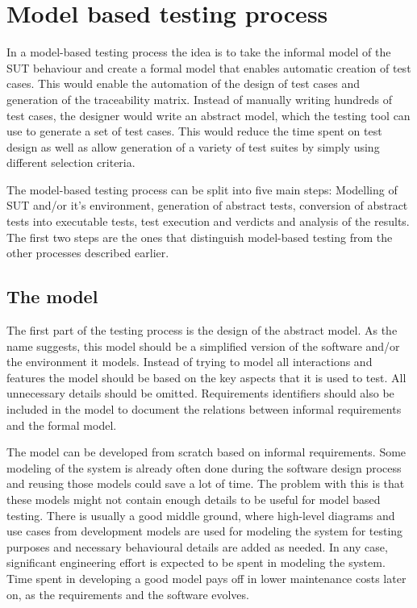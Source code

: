 \section{Model based testing process}
In a model-based testing process the idea is to take the informal model of the SUT behaviour and create a formal model that enables automatic creation of test cases. This would enable the automation of the design of test cases and generation of the traceability matrix. Instead of manually writing hundreds of test cases, the designer would write an abstract model, which the testing tool can use to generate a set of test cases. This would reduce the time spent on test design as well as allow generation of a variety of test suites by simply using different selection criteria.

The model-based testing process can be split into five main steps: Modelling of SUT and/or it's environment, generation of abstract tests, conversion of abstract tests into executable tests, test execution and verdicts and analysis of the results. The first two steps are the ones that distinguish model-based testing from the other processes described earlier.


\subsection{The model}
The first part of the testing process is the design of the abstract model. As the name suggests, this model should be a simplified version of the software and/or the environment it models. Instead of trying to model all interactions and features the model should be based on the key aspects that it is used to test. All unnecessary details should be omitted. Requirements identifiers should also be included in the model to document the relations between informal requirements and the formal model.

The model can be developed from scratch based on informal requirements. Some modeling of the system is already often done during the software design process and reusing those models could save a lot of time. The problem with this is that these models might not contain enough details to be useful for model based testing. There is usually a good middle ground, where high-level diagrams and use cases from development models are used for modeling the system for testing purposes and necessary behavioural details are added as needed. In any case, significant engineering effort is expected to be spent in modeling the system. Time spent in developing a good model pays off in lower maintenance costs later on, as the requirements and the software evolves. 

